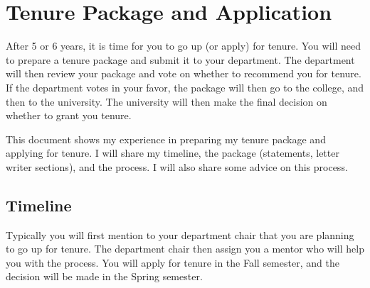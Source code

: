\documentclass[oneside,11pt,dvipsnames]{book}
\begin{document}


\chapter{Tenure Package and Application}
After 5 or 6 years, it is time for you to go up (or apply) for tenure.  You will need to prepare a tenure package and submit it to your department.  The department will then review your package and vote on whether to recommend you for tenure.  If the department votes in your favor, the package will then go to the college, and then to the university.  The university will then make the final decision on whether to grant you tenure.

This document shows my experience in preparing my tenure package and applying for tenure. I will share my timeline, the package (statements, letter writer sections), and the process.  I will also share some advice on this process.


\section{Timeline}
Typically you will first mention to your department chair that you are planning to go up for tenure. The department chair then assign you a mentor who will help you with the process. You will apply for tenure in the Fall semester, and the decision will be made in the Spring semester.  
\end{document}
